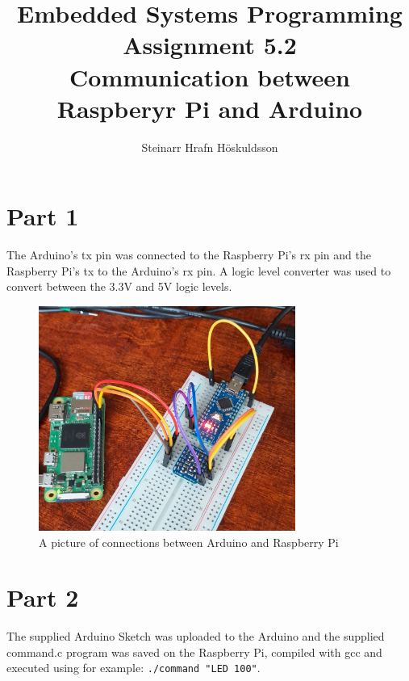 \documentclass{article}
\title{Embedded Systems Programming \\ Assignment 5.2 \\ \large Communication between Raspberyr Pi and Arduino}
\author{Steinarr Hrafn Höskuldsson}
\newcommand{\mycomment}[1]{}
\begin{document}
\pagestyle{firststyle}
{\let\newpage\relax\maketitle}

\mycomment{
\begin{figure}[h]
    \centering
    \texttt{[image: LAB3/Basic1.png]}
    \caption{"Switch test" Breadboard set up}
    \label{fig:Switch_test}
\end{figure}



}


\section*{Part 1}
The Arduino's tx pin was connected to the Raspberry Pi's rx pin and the Raspberry Pi's tx to the Arduino's rx pin. A logic level converter was used to convert between the 3.3V and 5V logic levels.

\begin{figure}[h]
    \centering
    \includegraphics[width=0.75\textwidth]{Assignment5_2Communication/20221025_134104.jpg}
    \caption{A picture of connections between Arduino and Raspberry Pi}
    \label{fig:part1}
\end{figure}

\section*{Part 2}
The supplied Arduino Sketch was uploaded to the Arduino and the supplied command.c program was saved on the Raspberry Pi, compiled with gcc and executed using for example: \verb!./command "LED 100"!. 
\end{document}
